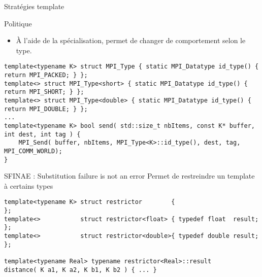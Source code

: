 \documentclass[handout,10pt]{beamer}
\begin{document}
\begin{frame}[fragile]{Stratégies template}
\tiny
\begin{block}{Politique}
\begin{itemize}
\item À l'aide de la spécialisation, permet de changer de comportement selon le type.
\end{itemize}
\end{block}
\begin{lstlisting}
template<typename K> struct MPI_Type { static MPI_Datatype id_type() { return MPI_PACKED; } };
template<> struct MPI_Type<short> { static MPI_Datatype id_type() { return MPI_SHORT; } };
template<> struct MPI_Type<double> { static MPI_Datatype id_type() { return MPI_DOUBLE; } };
...
template<typename K> bool send( std::size_t nbItems, const K* buffer, int dest, int tag ) {
    MPI_Send( buffer, nbItems, MPI_Type<K>::id_type(), dest, tag, MPI_COMM_WORLD);
}
\end{lstlisting}
\begin{block}{SFINAE : Substitution failure is not an error}
Permet de restreindre un template à certains types
\begin{lstlisting}
template<typename K> struct restrictor        {                        };
template<>           struct restrictor<float> { typedef float  result; };
template<>           struct restrictor<double>{ typedef double result; };

template<typename Real> typename restrictor<Real>::result
distance( K a1, K a2, K b1, K b2 ) { ... }
\end{lstlisting}
\end{block}
\end{frame}
\end{document}
